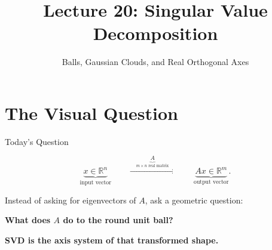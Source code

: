 \documentclass[10pt]{beamer}
\title{Lecture 20: Singular Value Decomposition}
\subtitle{Balls, Gaussian Clouds, and Real Orthogonal Axes}
\date{}
\theoremstyle{definition}
\newcommand{\x}[1]{\alert{\textbf{#1}}}
\begin{document}
\begin{frame}[plain,shrink=10]
\titlepage
\end{frame}

\section{The Visual Question}

\begin{frame}{Today's Question}

$$
\underbrace{x\in\mathbb R^n}_{\text{input vector}}
\qquad
\xrightarrow{\quad
\underbrace{A}_{m\times n\text{ real matrix}}
\quad}
\qquad
\underbrace{Ax\in\mathbb R^m}_{\text{output vector}}.
$$

\vfill

Instead of asking for eigenvectors of $A$, ask a geometric question:

\vfill

\begin{center}
{\Large\x{What does $A$ do to the round unit ball?}}
\end{center}

\vfill

\begin{center}
\x{SVD is the axis system of that transformed shape.}
\end{center}

\end{frame}
\end{document}
